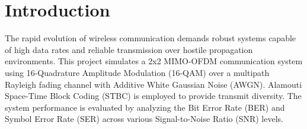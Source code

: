 \documentclass[a4paper]{article}
\begin{document}


\begin{abstract}
The objective of this project is to simulate and evaluate the performance of a 2x2 Multiple-Input Multiple-Output Orthogonal Frequency Division Multiplexing (MIMO-OFDM) communication system. The system utilizes 16-QAM modulation and Alamouti Space-Time Block Coding (STBC) over a multipath Rayleigh fading channel with Additive White Gaussian Noise (AWGN). Perfect Channel State Information (CSI) is assumed at the receiver to perform Maximum Likelihood detection. The system's performance is quantitatively evaluated using Bit Error Rate (BER) and Symbol Error Rate (SER) as functions of the Signal-to-Noise Ratio (SNR). Simulation results demonstrate the effectiveness of combining OFDM with Alamouti STBC to combat multipath fading and achieve significant diversity gain.
\end{abstract}

\newpage
\begingroup
\hypersetup{linkcolor=black}
\tableofcontents
\endgroup
\newpage

\section{Introduction}
The rapid evolution of wireless communication demands robust systems capable of high data rates and reliable transmission over hostile propagation environments. This project simulates a 2x2 MIMO-OFDM communication system using 16-Quadrature Amplitude Modulation (16-QAM) over a multipath Rayleigh fading channel with Additive White Gaussian Noise (AWGN). Alamouti Space-Time Block Coding (STBC) is employed to provide transmit diversity. The system performance is evaluated by analyzing the Bit Error Rate (BER) and Symbol Error Rate (SER) across various Signal-to-Noise Ratio (SNR) levels.
\end{document}
